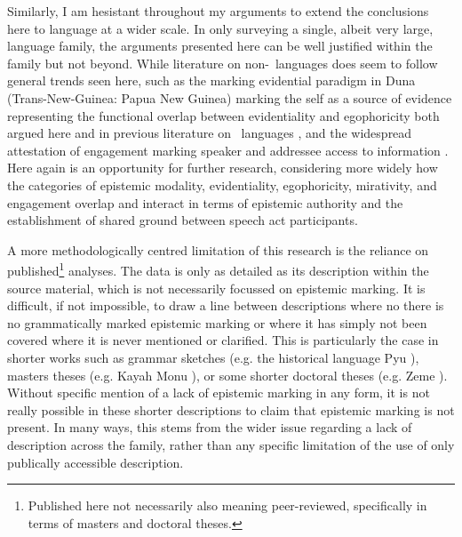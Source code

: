 Similarly, I am hesistant throughout my arguments to extend the conclusions here to language at a wider scale. In only surveying a single, albeit very large, language family, the arguments presented here can be well justified within the family but not beyond. While literature on non-\lfam\ languages does seem to follow general trends seen here, such as the marking evidential paradigm in Duna (Trans-New-Guinea: Papua New Guinea) marking the self as a source of evidence \cite{SanRoque2012} representing the functional overlap between evidentiality and egophoricity both argued here and in previous literature on \lfam\ languages \cites{Gawne2017}{Hill2020}, and the widespread attestation of engagement marking speaker and addressee access to information \cite{EvansBergqvistSanRoque2018a}. Here again is an opportunity for further research, considering more widely how the categories of epistemic modality, evidentiality, egophoricity, mirativity, and engagement overlap and interact in terms of epistemic authority and the establishment of shared ground between speech act participants.

A more methodologically centred limitation of this research is the reliance on published\footnote{Published here not necessarily also meaning peer-reviewed, specifically in terms of masters and doctoral theses.} analyses. The data is only as detailed as its description within the source material, which is not necessarily focussed on epistemic marking. It is difficult, if not impossible, to draw a line between descriptions where no there is no grammatically marked epistemic marking or where it has simply not been covered where it is never mentioned or clarified. This is particularly the case in shorter works such as grammar sketches (e.g. the historical language Pyu \cite[Subfamily Unclear: Myanmar][]{Miyake2019}), masters theses (e.g. Kayah Monu \cite[Karenic: Myanmar][]{Aung2013}), or some shorter doctoral theses (e.g. Zeme \cite[Zeme subfamily: India][]{Chanu2017}). Without specific mention of a lack of epistemic marking in any form, it is not really possible in these shorter descriptions to claim that epistemic marking is not present. In many ways, this stems from the wider issue regarding a lack of description across the family, rather than any specific limitation of the use of only publically accessible description.

